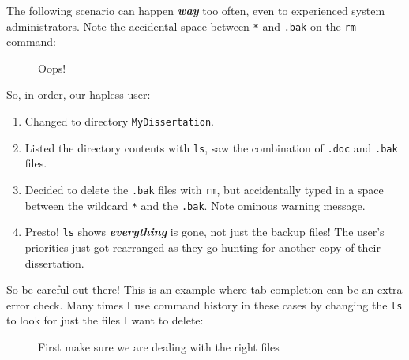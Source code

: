 \documentclass[10pt,american,]{book}
\newenvironment{Shaded}{\begin{snugshade}}{\end{snugshade}}
\newcommand{\KeywordTok}[1]{\textcolor[rgb]{0.13,0.29,0.53}{\textbf{{#1}}}}
\newcommand{\NormalTok}[1]{{#1}}
\numberwithin{figure}{chapter}
\DeclareRobustCommand{\drcap}[1]{\begin{figure}[H]\caption{#1}\end{figure}}
\renewcommand{\KeywordTok}[1]{{#1}}
\renewcommand{\NormalTok}[1]{{#1}}
\begin{document}
The following scenario can happen \textbf{\emph{way}} too often, even to
experienced system administrators. Note the accidental space between
\texttt{*} and \texttt{.bak} on the \texttt{rm} command:

\drcap{Oops!}

\begin{Shaded}
\end{Shaded}

So, in order, our hapless user:

\begin{enumerate}
\def\labelenumi{\arabic{enumi}.}
\item
  Changed to directory \texttt{MyDissertation}.
\item
  Listed the directory contents with \texttt{ls}, saw the combination of
  \texttt{.doc} and \texttt{.bak} files.
\item
  Decided to delete the \texttt{.bak} files with \texttt{rm}, but
  accidentally typed in a space between the wildcard \texttt{*} and the
  \texttt{.bak}. Note ominous warning message.
\item
  Presto! \texttt{ls} shows \textbf{\emph{everything}} is gone, not just
  the backup files! The user's priorities just got rearranged as they go
  hunting for another copy of their dissertation.
\end{enumerate}

So be careful out there! This is an example where tab completion can be
an extra error check. Many times I use command history in these cases by
changing the \texttt{ls} to look for just the files I want to delete:

\drcap{First make sure we are dealing with the right files}

\begin{Shaded}
\end{Shaded}
\end{document}
